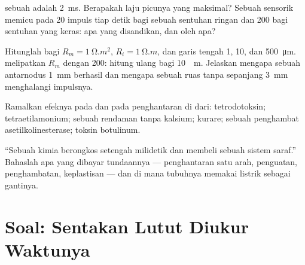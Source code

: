 \begin{exercise}[$\star\star$]\label{exo:b2:neurons-synapses:9}
 sebuah  adalah \qty{2}{ms}. Berapakah laju
picunya yang maksimal? Sebuah  sensorik memicu pada 20 impuls
tiap detik bagi sebuah sentuhan ringan dan 200 bagi sentuhan yang
keras: apa yang disandikan, dan oleh apa?
\end{exercise}

\begin{exercise}[$\star\star\star$]\label{exo:b2:neurons-synapses:10}
Hitunglah  bagi $R_m = \qty{1}{\ohm.m^2}$, $R_i =
\qty{1}{\ohm.m}$, dan garis tengah 1, 10, dan \qty{500}{\micro m}.
 melipatkan $R_m$ dengan 200: hitung ulang bagi \qty{10}{\micro
m}. Jelaskan mengapa sebuah antarnodus \qty{1}{mm} berhasil dan mengapa
sebuah ruas tanpa  sepanjang \qty{3}{mm} menghalangi impulsnya.
\end{exercise}

\begin{exercise}[$\star\star\star$]\label{exo:b2:neurons-synapses:11}
Ramalkan efeknya pada  dan pada penghantaran di
 dari: tetrodotoksin; tetraetilamonium; sebuah
rendaman tanpa kalsium; kurare; sebuah penghambat asetilkolinesterase;
toksin botulinum.
\end{exercise}

\begin{exercise}[$\star\star\star$]\label{exo:b2:neurons-synapses:12}
``Sebuah  kimia berongkos setengah milidetik dan membeli sebuah
sistem saraf.'' Bahaslah apa yang dibayar tundaannya --- penghantaran
satu arah, penguatan, penghambatan, keplastisan --- dan di mana tubuhnya
memakai  listrik sebagai gantinya.
\end{exercise}

\section{Soal: Sentakan Lutut Diukur Waktunya}


